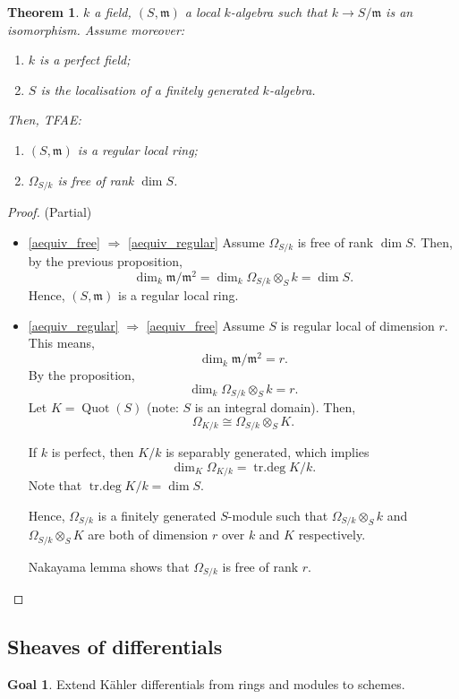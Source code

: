 \documentclass[12pt]{article}
\DeclareMathOperator{\Quot}{Quot}
\DeclareMathOperator{\trdeg}{tr.deg}
\newtheorem*{theorem}{Theorem}
\theoremstyle{definition}
\newtheorem*{goal}{Goal}
\theoremstyle{remark}
\begin{document}
\begin{theorem}
$k$ a field, $(S,\mathfrak{m})$ a local $k$-algebra such that $k\rightarrow S/\mathfrak{m}$ is an isomorphism. Assume moreover:
\begin{enumerate}[label=\arabic*)]
\item $k$ is a perfect field;
\item $S$ is the localisation of a finitely generated $k$-algebra.
\end{enumerate}
Then, TFAE:
\begin{enumerate}[label=\arabic*)]
\item\label{aequiv_regular} $(S,\mathfrak{m})$ is a regular local ring;
\item\label{aequiv_free} $\Omega_{S/k}$ is free of rank $\dim S$.
\end{enumerate}
\end{theorem}

\begin{proof}
(Partial)
\begin{itemize}
\item \ref{aequiv_free} $\Rightarrow$ \ref{aequiv_regular} Assume $\Omega_{S/k}$ is free of rank $\dim S$. Then, by the previous proposition,
\[\dim_k\mathfrak{m}/\mathfrak{m}^2=\dim_k\Omega_{S/k}\otimes_Sk=\dim S.\]
Hence, $(S,\mathfrak{m})$ is a regular local ring.
\item \ref{aequiv_regular} $\Rightarrow$ \ref{aequiv_free} Assume $S$ is regular local of dimension $r$. This means,
\[\dim_k\mathfrak{m}/\mathfrak{m}^2=r.\]
By the proposition,
\[\dim_k\Omega_{S/k}\otimes_Sk=r.\]
Let $K=\Quot(S)$ (note: $S$ is an integral domain). Then,
\[\Omega_{K/k}\cong\Omega_{S/k}\otimes_SK.\]

If $k$ is perfect, then $K/k$ is separably generated, which implies
\[\dim_K\Omega_{K/k}=\trdeg K/k.\]
Note that $\trdeg K/k=\dim S$.

Hence, $\Omega_{S/k}$ is a finitely generated $S$-module such that $\Omega_{S/k}\otimes_Sk$ and $\Omega_{S/k}\otimes_SK$ are both of dimension $r$ over $k$ and $K$ respectively.

Nakayama lemma shows that $\Omega_{S/k}$ is free of rank $r$.
\end{itemize}
\end{proof}

\subsection*{Sheaves of differentials}
\begin{goal}
Extend K\"{a}hler differentials from rings and modules to schemes.
\end{goal}
\end{document}
